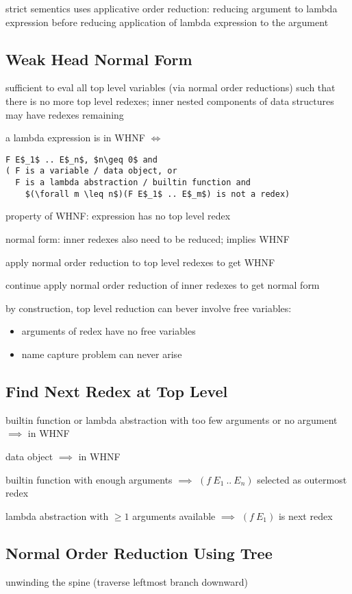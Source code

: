 \documentclass[8pt]{extarticle}
\begin{document}
\begin{multicols*}{2}
strict sementics uses applicative order reduction: reducing argument to lambda expression before reducing application of lambda expression to the argument

\subsection{Weak Head Normal Form}

sufficient to eval all top level variables (via normal order reductions) such that there is no more top level redexes; inner nested components of data structures may have redexes remaining

a lambda expression is in WHNF $\iff$
\begin{lstlisting}
F E$_1$ .. E$_n$, $n\geq 0$ and
( F is a variable / data object, or
  F is a lambda abstraction / builtin function and
    $(\forall m \leq n$)(F E$_1$ .. E$_m$) is not a redex)
\end{lstlisting}

property of WHNF: expression has no top level redex

normal form: inner redexes also need to be reduced; implies WHNF

apply normal order reduction to top level redexes to get WHNF

continue apply normal order reduction of inner redexes to get normal form

by construction, top level reduction can bever involve free variables:
\begin{itemize}
\item arguments of redex have no free variables
\item name capture problem can never arise
\end{itemize}

\subsection{Find Next Redex at Top Level}
builtin function or lambda abstraction with too few arguments or no argument $\implies$ in WHNF

data object $\implies$ in WHNF

builtin function with enough arguments $\implies$ $(f\ E_1\ ..\ E_n)$ selected as outermost redex

lambda abstraction with $\geq 1$ arguments available $\implies$ $(f\ E_1)$ is next redex

\subsection{Normal Order Reduction Using Tree}
unwinding the spine (traverse leftmost branch downward)


\end{multicols*}
\end{document}
